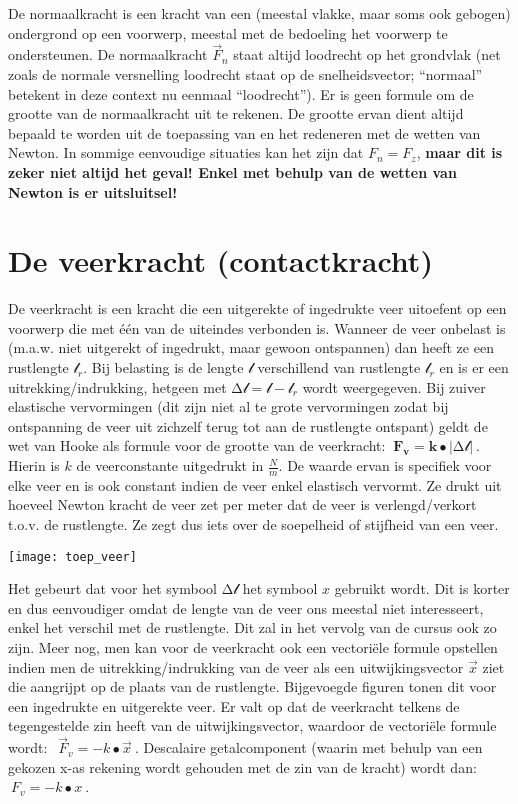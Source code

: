 \documentclass{ximera}
\begin{document}
De normaalkracht is een kracht van een (meestal vlakke, maar soms ook gebogen) ondergrond op een voorwerp, meestal met de bedoeling het voorwerp te ondersteunen. 
De normaalkracht \({\overrightarrow{F}}_{n}\) staat altijd loodrecht op het grondvlak (net zoals de normale versnelling loodrecht staat op de snelheidsvector; ``normaal'' betekent in deze context nu eenmaal ``loodrecht''). 
Er is geen formule om de grootte van de normaalkracht uit te rekenen. 
De grootte ervan dient altijd bepaald te worden uit de toepassing van en het redeneren met de wetten van Newton. 
In sommige eenvoudige situaties kan het zijn dat \(F_{n} = F_{z}\), \textbf{maar dit is zeker niet altijd het geval! Enkel met behulp van de wetten van Newton is er uitsluitsel!}

\section*{De veerkracht (contactkracht)}
De veerkracht is een kracht die een uitgerekte of ingedrukte veer uitoefent op een voorwerp die met één van de uiteindes verbonden is.
Wanneer de veer onbelast is (m.a.w. niet uitgerekt of ingedrukt, maar gewoon ontspannen) dan heeft ze een rustlengte \(\mathcal{l}_{r}\). 
Bij belasting is de lengte \(\mathcal{l}\) verschillend van rustlengte \(\mathcal{l}_{r}\) en is er een uitrekking/indrukking, hetgeen met \(\mathcal{\mathrm{\Delta}l = l -}\mathcal{l}_{r}\) wordt weergegeven.
Bij zuiver elastische vervormingen (dit zijn niet al te grote vervormingen zodat bij ontspanning de veer uit zichzelf terug tot aan de rustlengte ontspant) geldt de wet van Hooke als formule voor de grootte van de veerkracht:
\(\mathbf{\ F}_{\mathbf{v}}\mathbf{= k \bullet}\left| \mathcal{\mathrm{\Delta}l} \right|\mathbf{\ }\).
Hierin is \(k\) de veerconstante uitgedrukt in \(\frac{N}{m}\). 
De waarde ervan is specifiek voor elke veer en is ook constant indien de veer enkel elastisch vervormt. 
Ze drukt uit hoeveel Newton kracht de veer zet per meter dat de veer is verlengd/verkort t.o.v. de rustlengte.
Ze zegt dus iets over de soepelheid of stijfheid van een veer.

\begin{image}
  \texttt{[image: toep\_veer]}
\end{image}

Het gebeurt dat voor het symbool \(\mathcal{\mathrm{\Delta}l}\) het symbool \(x\) gebruikt wordt. 
Dit is korter en dus eenvoudiger omdat de lengte van de veer ons meestal niet interesseert, enkel het verschil met de rustlengte. 
Dit zal in het vervolg van de cursus ook zo zijn. 
Meer nog, men kan voor de veerkracht ook een vectoriële formule opstellen indien men de uitrekking/indrukking van de veer als een uitwijkingsvector \(\overrightarrow{x}\) ziet die aangrijpt op de plaats van de rustlengte. Bijgevoegde figuren tonen dit voor een ingedrukte en uitgerekte veer. 
Er valt op dat de veerkracht telkens de tegengestelde zin heeft van de uitwijkingsvector, waardoor de vectoriële formule wordt:
\(\ {\ \overrightarrow{F}}_{v} = - k \bullet \overrightarrow{x}\ \). 
Descalaire getalcomponent (waarin met behulp van een gekozen x-as rekening wordt gehouden met de zin van de kracht) wordt dan:
\({\ F}_{v} = - k \bullet x\ \).
\end{document}
